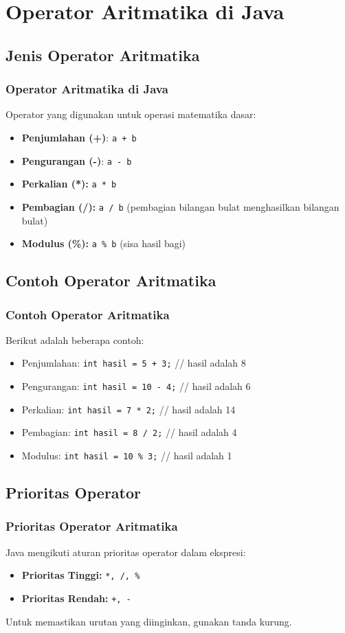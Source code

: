 \documentclass[aspectratio=169, table]{beamer}
\begin{document}
\section{Operator Aritmatika di Java}

\subsection{Jenis Operator Aritmatika}
\begin{frame}[fragile]
	\frametitle{Operator Aritmatika di Java}
	Operator yang digunakan untuk operasi matematika dasar:
	\begin{itemize}
		\item \textbf{Penjumlahan (+)}: \texttt{a + b}
		\item \textbf{Pengurangan (-)}: \texttt{a - b}
		\item \textbf{Perkalian (*):} \texttt{a * b}
		\item \textbf{Pembagian (/):} \texttt{a / b} (pembagian bilangan bulat menghasilkan bilangan bulat)
		\item \textbf{Modulus (\%):} \texttt{a \% b} (sisa hasil bagi)
	\end{itemize}
\end{frame}

\subsection{Contoh Operator Aritmatika}
\begin{frame}[fragile]
	\frametitle{Contoh Operator Aritmatika}
	Berikut adalah beberapa contoh:
	\begin{itemize}
		\item Penjumlahan: \texttt{int hasil = 5 + 3;} // hasil adalah 8
		\item Pengurangan: \texttt{int hasil = 10 - 4;} // hasil adalah 6
		\item Perkalian: \texttt{int hasil = 7 * 2;} // hasil adalah 14
		\item Pembagian: \texttt{int hasil = 8 / 2;} // hasil adalah 4
		\item Modulus: \texttt{int hasil = 10 \% 3;} // hasil adalah 1
	\end{itemize}
\end{frame}

\subsection{Prioritas Operator}
\begin{frame}[fragile]
	\frametitle{Prioritas Operator Aritmatika}
	Java mengikuti aturan prioritas operator dalam ekspresi:
	\begin{itemize}
		\item \textbf{Prioritas Tinggi:} \texttt{*, /, \%}
		\item \textbf{Prioritas Rendah:} \texttt{+, -}
	\end{itemize}
	Untuk memastikan urutan yang diinginkan, gunakan tanda kurung.
\end{frame}
\end{document}
